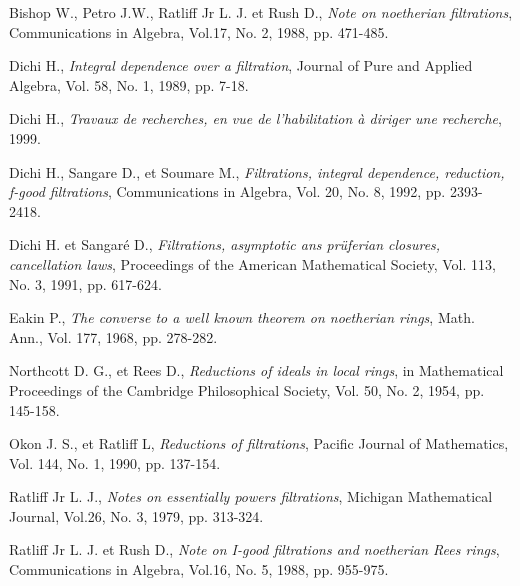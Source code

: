 \begin{thebibliography}{99}
	
	
	 Bishop W., Petro J.W., Ratliff Jr L. J. et Rush D.,\textit{ Note on noetherian filtrations}, Communications in Algebra, Vol.17, No. 2, 1988, pp. 471-485.
	
	 Dichi H.,\textit{ Integral dependence over a filtration}, Journal of Pure and Applied Algebra, Vol. 58, No. 1, 1989, pp. 7-18. 
	
	 Dichi H., \textit{Travaux de recherches, en vue de l'habilitation à diriger une recherche}, 1999.	
	
	 Dichi H., Sangare D., et Soumare M.,\textit{ Filtrations, integral dependence, reduction, f-good filtrations}, Communications in Algebra, Vol. 20, No. 8, 1992, pp. 2393-2418.
	
	 Dichi H. et Sangaré D.,\textit{ Filtrations, asymptotic ans prüferian closures, cancellation laws}, Proceedings of the American Mathematical Society, Vol. 113, No. 3, 1991, pp. 617-624. 
	
	 Eakin P., \textit{The converse to a well known theorem on noetherian rings}, Math. Ann., Vol. 177, 1968, pp. 278-282.
	
	 Northcott D. G., et Rees D.,\textit{ Reductions of ideals in local rings}, in Mathematical Proceedings of the Cambridge Philosophical Society, Vol. 50, No. 2, 1954, pp. 145-158.
	
	 Okon J. S., et Ratliff L,\textit{ Reductions of filtrations}, Pacific Journal of Mathematics, Vol. 144, No. 1, 1990, pp. 137-154.
	
	 Ratliff Jr L. J.,\textit{ Notes on essentially powers filtrations}, Michigan Mathematical Journal, Vol.26, No. 3, 1979, pp. 313-324.
	
	 Ratliff Jr L. J. et Rush D.,\textit{ Note on I-good filtrations and noetherian Rees rings}, Communications in Algebra, Vol.16, No. 5, 1988, pp. 955-975.

\end{thebibliography}
